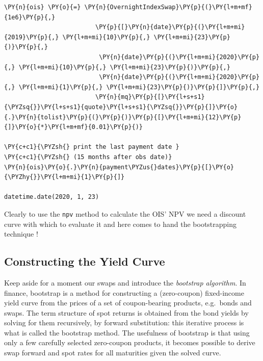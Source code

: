 \begin{tcolorbox}[breakable, size=fbox, boxrule=1pt, pad at break*=1mm, colback=cellbackground, colframe=cellborder]
\begin{Verbatim}[commandchars=\\\{\}]
\PY{n}{ois} \PY{o}{=} \PY{n}{OvernightIndexSwap}\PY{p}{(}\PY{l+m+mf}{1e6}\PY{p}{,}
                         \PY{p}{[}\PY{n}{date}\PY{p}{(}\PY{l+m+mi}{2019}\PY{p}{,} \PY{l+m+mi}{10}\PY{p}{,} \PY{l+m+mi}{23}\PY{p}{)}\PY{p}{,}
                          \PY{n}{date}\PY{p}{(}\PY{l+m+mi}{2020}\PY{p}{,} \PY{l+m+mi}{10}\PY{p}{,} \PY{l+m+mi}{23}\PY{p}{)}\PY{p}{,}
                          \PY{n}{date}\PY{p}{(}\PY{l+m+mi}{2020}\PY{p}{,} \PY{l+m+mi}{1}\PY{p}{,} \PY{l+m+mi}{23}\PY{p}{)}\PY{p}{]}\PY{p}{,}
                         \PY{n}{mq}\PY{p}{[}\PY{l+s+s1}{\PYZsq{}}\PY{l+s+s1}{quote}\PY{l+s+s1}{\PYZsq{}}\PY{p}{]}\PY{o}{.}\PY{n}{tolist}\PY{p}{(}\PY{p}{)}\PY{p}{[}\PY{l+m+mi}{12}\PY{p}{]}\PY{o}{*}\PY{l+m+mf}{0.01}\PY{p}{)}

\PY{c+c1}{\PYZsh{} print the last payment date }
\PY{c+c1}{\PYZsh{} (15 months after obs date)}
\PY{n}{ois}\PY{o}{.}\PY{n}{payment\PYZus{}dates}\PY{p}{[}\PY{o}{\PYZhy{}}\PY{l+m+mi}{1}\PY{p}{]}

datetime.date(2020, 1, 23)
\end{Verbatim}
\end{tcolorbox}

Clearly to use the \texttt{npv} method to calculate the OIS' NPV we need a discount curve with which to evaluate it and here comes to hand the bootstrapping technique !

\subsection{Constructing the Yield Curve}\label{the-bootstrapping-technique}

Keep aside for a moment our swaps and introduce the \emph{bootstrap
algorithm}. In finance, bootstrap is a method for constructing a
(zero-coupon) fixed-income yield curve from the prices of a set of
coupon-bearing products, e.g.~bonds and swaps. The term structure of
spot returns is obtained from the bond yields by solving for them
recursively, by forward substitution: this iterative process is what is
called the bootstrap method. The usefulness of bootstrap is that using
only a few carefully selected zero-coupon products, it becomes possible
to derive swap forward and spot rates for all maturities given the
solved curve.

